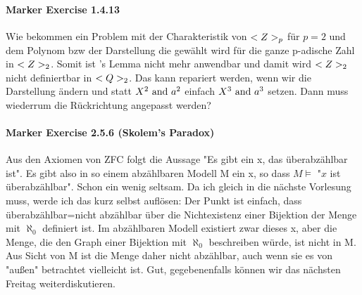 \paragraph*{Marker Exercise 1.4.13}
Wie bekommen ein Problem mit der Charakteristik von $<Z>_p$ für $p = 2$ und dem Polynom bzw der Darstellung die gewählt wird für die ganze p-adische Zahl in $<Z>_2$. Somit ist 's Lemma nicht mehr anwendbar und damit wird $<Z>_2$ nicht definiertbar in $<Q>_2$. Das kann repariert werden, wenn wir die Darstellung ändern und statt $X^2 \text{ and } a^2$ einfach $X^3 \text{ and } a^3$ setzen. Dann muss wiederrum die Rückrichtung angepasst werden? 

\paragraph*{Marker Exercise 2.5.6 (Skolem's Paradox)}
Aus den Axiomen von ZFC folgt die Aussage "Es gibt ein x, das überabzählbar ist". Es gibt also in so einem abzählbaren Modell M ein x, so dass $M\models$ "$x$ ist überabzählbar". Schon ein wenig seltsam.
Da ich gleich in die nächste Vorlesung muss, werde ich das kurz selbst auflösen:
Der Punkt ist einfach, dass überabzählbar=nicht abzählbar über die Nichtexistenz einer Bijektion der Menge mit $\aleph_0$ definiert ist. Im abzählbaren Modell existiert zwar dieses x, aber die Menge, die den Graph einer Bijektion mit $\aleph_0$ beschreiben würde, ist nicht in M. Aus Sicht von M ist die Menge daher nicht abzählbar, auch wenn sie es von "außen" betrachtet vielleicht ist. 
Gut, gegebenenfalls können wir das nächsten Freitag weiterdiskutieren.

